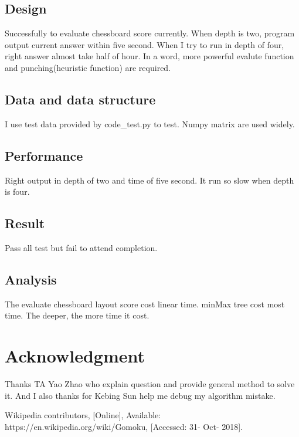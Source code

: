 \documentclass[conference,compsoc]{IEEEtran}
\begin{document}
\subsection{Design}
Successfully to evaluate chessboard score currently. When depth is two, program
output current answer within five second. When I try to run in depth of four,
right answer almost take half of hour. In a word, more powerful evalute
function and punching(heuristic function) are required.

\subsection{Data and data structure}
I use test data provided by code\_test.py to test. Numpy matrix are used widely.

\subsection{Performance}
Right output in depth of two and time of five second. It run so slow when
depth is four.

\subsection{Result}
Pass all test but fail to attend completion.

\subsection{Analysis}
The evaluate chessboard layout score cost linear time. minMax tree cost most
time. The deeper, the more time it cost.

\section*{Acknowledgment}
Thanks TA Yao Zhao who explain question and provide general method to solve it.
And I also thanks for Kebing Sun help me debug my algorithm mistake.


\begin{thebibliography}{1}
Wikipedia contributors, [Online], Available: https://en.wikipedia.org/wiki/Gomoku,
[Accessed: 31- Oct- 2018].
\end{thebibliography}

\end{document}
